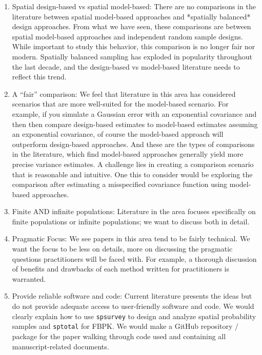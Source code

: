 \begin{enumerate}
  \item Spatial design-based vs spatial model-based: There are no comparisons in the literature between spatial model-based approaches and *spatially balanced* design approaches. From what we have seen, these comparisons are between spatial model-based approaches and independent random sample designs. While important to study this behavior, this comparison is no longer fair nor modern. Spatially balanced sampling has exploded in popularity throughout the last decade, and the design-based vs model-based literature needs to reflect this trend.
  \item A ``fair'' comparison: We feel that literature in this area has considered scenarios that are more well-suited for the model-based scenario. For example, if you simulate a Gaussian error with an exponential covariance and then then compare design-based estimates to model-based estimates assuming an exponential covariance, of course the model-based approach will outperform design-based approaches. And these are the types of comparisons in the literature, which find model-based approaches generally yield more precise variance estimates. A challenge lies in creating a comparison scenario that is reasonable and intuitive. One this to consider would be exploring the comparison after estimating a misspecified covariance function using model-based approaches. 
  \item Finite AND infinite populations: Literature in the area focuses specifically on finite populations or infinite populations; we want to discuss both in detail.
  \item Pragmatic Focus: We see papers in this area tend to be fairly technical. We want the focus to be less on details, more on discussing the pragmatic questions practitioners will be faced with. For example, a thorough discussion of benefits and drawbacks of each method written for practitioners is warranted.
  \item Provide reliable software and code: Current literature presents the ideas but do not provide adequate access to user-friendly software and code. We would clearly explain how to use \texttt{spsurvey} to design and analyze spatial probability samples and \texttt{sptotal} for FBPK. We would make a GitHub repository / package for the paper walking through code used and containing all manuscript-related documents.

\end{enumerate}

